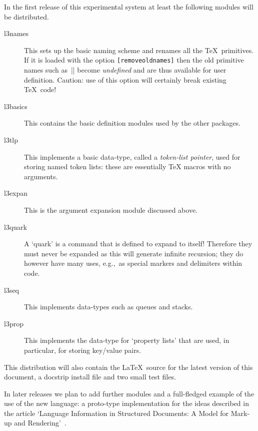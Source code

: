 \documentclass{article}
\providecommand \eg {e.g.,~}
\begin{document}
In the first release of this experimental system at least the
following modules will be distributed.
\begin{description}
\item[l3names] This sets up the basic naming scheme and renames all
the \TeX\ primitives.  If it is loaded with the option
\texttt{[removeoldnames]} then the old primitive names such as~|\box|
become \emph{undefined} and are thus available for user
definition. Caution: use of this option will certainly break existing
\TeX\ code!

\item [l3basics]
This contains the basic definition modules used
by the other packages.

\item[l3tlp]
This implements a basic data-type, called a \textit{token-list
pointer}, used for storing named token lists: these are essentially
\TeX{} macros with no arguments.

\item[l3expan] This is the argument expansion module discussed above.

\item[l3quark] A `quark' is a command that is defined to expand to
itself!  Therefore they must never be expanded as this will generate
infinite recursion; they do however have many uses, \eg as
special markers and delimiters within code.

\item[l3seq]
This implements data-types such as queues and stacks.

\item[l3prop]
This implements the data-type for `property lists' that are used, in
particular, for storing key/value pairs.
\end{description}
This distribution will also contain the \LaTeX\ source for the latest
version of this document, a docstrip install file and two small test
files.

In later releases we plan to add further modules and a full-fledged
example of the use of the new language: a proto-type implementation
for the ideas described in the article `Language Information in
Structured Documents: A Model for Mark-up and
Rendering'~\cite{tub:MR98-2}.
\end{document}
